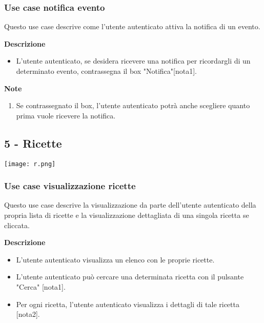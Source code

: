 \documentclass[a4paper,12pt]{article}
\begin{document}
\subsubsection*{Use case notifica evento}

Questo use case descrive come l'utente autenticato attiva la notifica di un evento.

\textbf{Descrizione}
\begin{itemize} \setlength\itemsep{0.01em}
\item L'utente autenticato, se desidera ricevere una notifica per ricordargli di un determinato evento, contrassegna il box "Notifica"[nota1].
\end{itemize}

\textbf{Note}
\begin{enumerate} \setlength\itemsep{0.01em}
\item Se contrassegnato il box, l'utente autenticato potrà anche scegliere quanto prima vuole ricevere la notifica.
\end{enumerate}



\subsection*{5 - Ricette }

\begin{center}
  \texttt{[image: r.png]}
\end{center}

\subsubsection*{Use case visualizzazione ricette}

Questo use case descrive la visualizzazione da parte dell'utente autenticato della propria lista di ricette e la visualizzazione dettagliata di una singola ricetta se cliccata.

\textbf{Descrizione}
\begin{itemize} \setlength\itemsep{0.01em}
\item L'utente autenticato visualizza un elenco con le proprie ricette.
\item L'utente autenticato può cercare una determinata ricetta con il pulsante "Cerca" [nota1].
\item Per ogni ricetta, l'utente autenticato visualizza i dettagli di tale ricetta [nota2].
\end{itemize}
\end{document}
